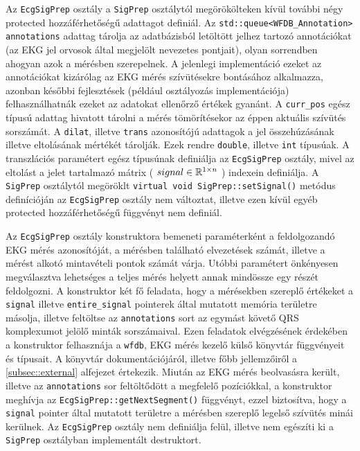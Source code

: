 \documentclass[oneside,titlepage,12pt,a4paper]{report}
\begin{document}
\par Az \texttt{EcgSigPrep} osztály a \texttt{SigPrep} osztálytól megörökölteken kívül további négy protected hozzáférhetőségű adattagot definiál. Az \texttt{std::queue<WFDB\_Annotation> annotations} adattag tárolja az adatbázisból letöltött jelhez tartozó annotációkat (az EKG jel orvosok által megjelölt nevezetes pontjait), olyan sorrendben ahogyan azok a mérésben szerepelnek. A jelenlegi implementáció ezeket az annotációkat kizárólag az EKG mérés szívütésekre bontásához alkalmazza, azonban későbbi fejlesztések (például osztályozás implementációja) felhasználhatnák ezeket az adatokat ellenőrző értékek gyanánt. A \texttt{curr\_pos} egész típusú adattag hivatott tárolni a mérés tömörítésekor az éppen aktuális szívütés sorszámát. A \texttt{dilat}, illetve \texttt{trans} azonosítójú adattagok a jel összehúzásának illetve eltolásának mértékét tárolják. Ezek rendre \texttt{double}, illetve \texttt{int} típusúak. A transzlációs paramétert egész típusúnak definiálja az \texttt{EcgSigPrep} osztály, mivel az eltolást a jelet tartalmazó mátrix ( $ signal \in \Bbb R^{1 \times n} $ ) indexein definiálja. A \texttt{SigPrep} osztálytól megöröklt \texttt{virtual void SigPrep::setSignal()} metódus definícióján az \texttt{EcgSigPrep} osztály nem változtat, illetve ezen kívül egyéb protected hozzáférhetőségű függvényt nem definiál.
\par Az \texttt{EcgSigPrep} osztály konstruktora bemeneti paraméterként a feldolgozandó EKG mérés azonosítóját, a mérésben található elvezetések számát, illetve a mérést alkotó mintavételi pontok számát várja. Utóbbi paramétert önkényesen megválasztva lehetséges a teljes mérés helyett annak mindössze egy részét feldolgozni. A konstruktor két fő feladata, hogy a mérésekben szereplő értékeket a \texttt{signal} illetve \texttt{entire\_signal} pointerek által mutatott memória területre másolja, illetve feltöltse az \texttt{annotations} sort az egymást követő QRS komplexumot jelölő minták sorszámaival. Ezen feladatok elvégzésének érdekében a konstruktor felhasznája a \texttt{wfdb}, EKG mérés kezelő külső könyvtár függvényeit és típusait. A könyvtár dokumentációjáról, illetve főbb jellemzőiről a \ref{subsec::external} alfejezet értekezik. Miután az EKG mérés beolvasásra került, illetve az \texttt{annotations} sor feltöltődött a megfelelő pozíciókkal, a konstruktor meghívja az \texttt{EcgSigPrep::getNextSegment()} függvényt, ezzel biztosítva, hogy a \texttt{signal} pointer által mutatott területre a mérésben szereplő legelső szívütés minái kerülnek. Az \texttt{EcgSigPrep} osztály nem definiálja felül, illetve nem egészíti ki a \texttt{SigPrep} osztályban implementált destruktort. 
\end{document}
